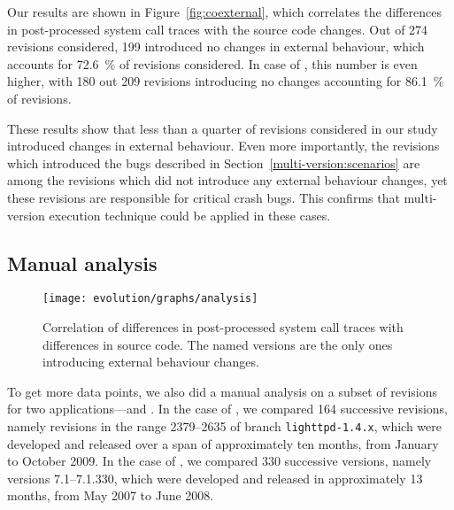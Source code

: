 Our results are shown in Figure~\ref{fig:coexternal}, which correlates the
differences in post-processed system call traces with the source code changes.
Out of 274 \lighttpd revisions considered, 199 introduced no changes in
external behaviour, which accounts for \SI{72.6}{\percent} of revisions considered. In case
of \lighttpdtwo, this number is even higher, with 180 out 209 revisions
introducing no changes accounting for \SI{86.1}{\percent} of revisions.

These results show that less than a quarter of revisions
considered in our study introduced changes in external behaviour. Even more
importantly, the revisions which introduced the bugs described in
Section~\ref{multi-version:scenarios} are among the revisions which did not
introduce any external behaviour changes, yet these revisions are responsible
for critical crash bugs. This confirms that multi-version execution technique
could be applied in these cases.


\subsection{Manual analysis}

\begin{figure}[t]
  \begin{center}
    \texttt{[image: evolution/graphs/analysis]}
    \caption{Correlation of differences in post-processed system call traces
      with differences in source code. The named versions are the only ones
      introducing external behaviour changes.}
    \label{fig:coanalysis}
  \end{center}
\end{figure}

To get more data points, we also did a manual analysis on a subset of revisions
for two applications---\lighttpd and \vim. In the case of \lighttpd, we
compared 164 successive revisions, namely revisions in the range 2379--2635 of
branch \texttt{lighttpd-1.4.x}, which were developed and released over a span
of approximately ten months, from January to October 2009. In the case of \vim,
we compared 330 successive versions, namely versions 7.1--7.1.330, which were
developed and released in approximately 13 months, from May 2007 to June 2008.


